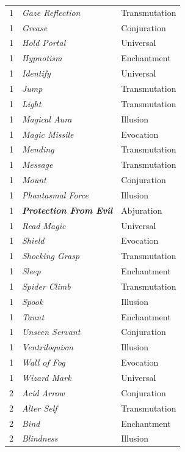 \begin{multicols}{2}
\begin{minipage}{\columnwidth}
\begin{tabular}{|p{}|p{}|p{}|}
\rowcolor[gray]{.9}1	& \textit{Gaze Reflection}	& Transmutation \\
1	& \textit{Grease}	& Conjuration \\
\rowcolor[gray]{.9}1	& \textit{Hold Portal}	& Universal \\
1	& \textit{Hypnotism}	& Enchantment \\
\rowcolor[gray]{.9}1	& \textit{Identify}	& Universal \\
1	& \textit{Jump}	& Transmutation \\
\rowcolor[gray]{.9}1	& \textit{Light}	& Transmutation \\
1	& \textit{Magical Aura}	& Illusion \\
\rowcolor[gray]{.9}1	& \textit{Magic Missile}	& Evocation \\
1	& \textit{Mending}	& Transmutation \\
\rowcolor[gray]{.9}1	& \textit{Message}	& Transmutation \\
1	& \textit{Mount}	& Conjuration \\
\rowcolor[gray]{.9}1	& \textit{Phantasmal Force}	& Illusion \\
1	& \textbf{\textit{Protection From Evil}}	& Abjuration \\
\rowcolor[gray]{.9}1	& \textit{Read Magic}	& Universal \\
1	& \textit{Shield}	& Evocation \\
\rowcolor[gray]{.9}1	& \textit{Shocking Grasp}	& Transmutation \\
1	& \textit{Sleep}	& Enchantment \\
\rowcolor[gray]{.9}1	& \textit{Spider Climb}	& Transmutation \\
1	& \textit{Spook}	& Illusion \\
\rowcolor[gray]{.9}1	& \textit{Taunt}	& Enchantment \\
1	& \textit{Unseen Servant}	& Conjuration \\
\rowcolor[gray]{.9}1	& \textit{Ventriloquism}	& Illusion \\
1	& \textit{Wall of Fog}	& Evocation \\
\rowcolor[gray]{.9}1	& \textit{Wizard Mark}	& Universal \\
2	& \textit{Acid Arrow}	& Conjuration \\
\rowcolor[gray]{.9}2	& \textit{Alter Self}	& Transmutation \\
2	& \textit{Bind}	& Enchantment \\
\rowcolor[gray]{.9}2	& \textit{Blindness}	& Illusion \\

\end{tabular}
\end{minipage}
\end{multicols}
